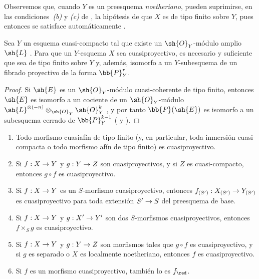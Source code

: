 \documentclass[oneside,10pt]{amsart}
\makeatletter
\newcommand{\ega@arrow}[2]{\mathchoice{#1}{#2}{#2}{#2}}
\renewcommand{\to}{\ega@arrow{\longrightarrow}{\rightarrow}}
\newcommand{\oldpage}[2][]{\marginnote{\normalfont\footnotesize\textbf{#1}~|~#2}\ignorespaces}
\let\EGAOriginalLabel\label
\renewcommand{\label}[1]{\phantomsection\EGAOriginalLabel{#1}}
\makeatother
\begin{document}
Observemos que, cuando $Y$ es un preesquema \emph{noetheriano}, pueden suprimirse, en las condiciones~\emph{(b)} y \emph{(c)} de , la hipótesis de que $X$ es de tipo finito sobre $Y$, pues entonces se satisface automáticamente .

\begin{corollary}[5.3.3]
\label{II.5.3.3}
Sea $Y$ un esquema cuasi-compacto tal que existe un $\sh{O}_Y$-módulo amplio $\sh{L}$ .
Para que un $Y$-esquema $X$ sea cuasiproyectivo, es necesario y suficiente que sea de tipo finito sobre $Y$ y, además, isomorfo a un $Y$-subesquema de un fibrado proyectivo de la forma $\bb{P}_Y^r$.
\end{corollary}

\begin{proof}
Si $\sh{E}$ es un $\sh{O}_Y$-módulo cuasi-coherente de tipo finito, entonces $\sh{E}$ es isomorfo a un cociente de un $\sh{O}_Y$-módulo $\sh{L}^{\otimes(-n)}\otimes_{\sh{O}_Y}\sh{O}_Y^k$ , y por tanto $\bb{P}(\sh{E})$ es isomorfo a un subesquema cerrado de $\bb{P}_Y^{k-1}$ ( y ).
\end{proof}

\begin{proposition}[5.3.4]
\label{II.5.3.4}
\medskip\noindent
\begin{enumerate}
  \item[{\rm(i)}] Todo morfismo cuasiafín de tipo finito (y, en particular, toda inmersión cuasi-compacta o todo morfismo afín de tipo finito) es cuasiproyectivo.
  \item[{\rm(ii)}] Si $f:X\to Y$ y $g:Y\to Z$ son cuasiproyectivos, y si $Z$ es cuasi-compacto, entonces $g\circ f$ es cuasiproyectivo.
\oldpage[II]{100}
  \item[{\rm(iii)}] Si $f:X\to Y$ es un $S$-morfismo cuasiproyectivo, entonces $f_{(S')}:X_{(S')}\to Y_{(S')}$ es cuasiproyectivo para toda extensión $S'\to S$ del preesquema de base.
  \item[{\rm(iv)}] Si $f:X\to Y$ y $g:X'\to Y'$ son dos $S$-morfismos cuasiproyectivos, entonces $f\times_S g$ es cuasiproyectivo.
  \item[{\rm(v)}] Si $f:X\to Y$ y $g:Y\to Z$ son morfismos tales que $g\circ f$ es cuasiproyectivo, y si $g$ es separado o $X$ es localmente noetheriano, entonces $f$ es cuasiproyectivo.
  \item[{\rm(vi)}] Si $f$ es un morfismo cuasiproyectivo, también lo es $f_\red$.
\end{enumerate}
\end{proposition}
\end{document}
